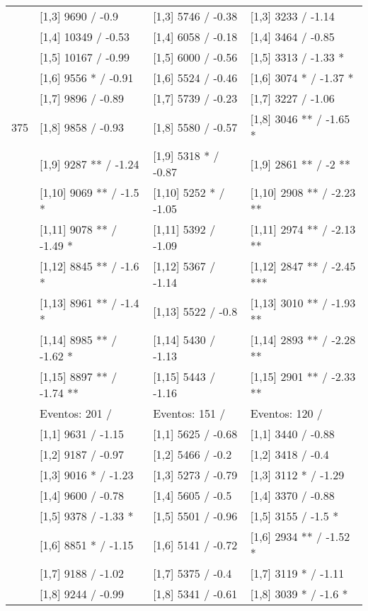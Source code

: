 \begin{table}
\begin{tabular}[t]{llll}
 & {}[1,3] 9690  / -0.9 & {}[1,3] 5746  / -0.38 & {}[1,3] 3233  / -1.14\\
\addlinespace
 & {}[1,4] 10349  / -0.53 & {}[1,4] 6058  / -0.18 & {}[1,4] 3464  / -0.85\\
 & {}[1,5] 10167  / -0.99 & {}[1,5] 6000  / -0.56 & {}[1,5] 3313  / -1.33 *\\
 & {}[1,6] 9556 * / -0.91 & {}[1,6] 5524  / -0.46 & {}[1,6] 3074 * / -1.37 *\\
 & {}[1,7] 9896  / -0.89 & {}[1,7] 5739  / -0.23 & {}[1,7] 3227  / -1.06\\
375 & {}[1,8] 9858  / -0.93 & {}[1,8] 5580  / -0.57 & {}[1,8] 3046 ** / -1.65 *\\
\addlinespace
 & {}[1,9] 9287 ** / -1.24 & {}[1,9] 5318 * / -0.87 & {}[1,9] 2861 ** / -2 **\\
 & {}[1,10] 9069 ** / -1.5 * & {}[1,10] 5252 * / -1.05 & {}[1,10] 2908 ** / -2.23 **\\
 & {}[1,11] 9078 ** / -1.49 * & {}[1,11] 5392  / -1.09 & {}[1,11] 2974 ** / -2.13 **\\
 & {}[1,12] 8845 ** / -1.6 * & {}[1,12] 5367  / -1.14 & {}[1,12] 2847 ** / -2.45 ***\\
 & {}[1,13] 8961 ** / -1.4 * & {}[1,13] 5522  / -0.8 & {}[1,13] 3010 ** / -1.93 **\\
\addlinespace
 & {}[1,14] 8985 ** / -1.62 * & {}[1,14] 5430  / -1.13 & {}[1,14] 2893 ** / -2.28 **\\
 & {}[1,15] 8897 ** / -1.74 ** & {}[1,15] 5443  / -1.16 & {}[1,15] 2901 ** / -2.33 **\\
 & Eventos:  201 / & Eventos:  151 / & Eventos:  120 /\\
 & {}[1,1] 9631  / -1.15 & {}[1,1] 5625  / -0.68 & {}[1,1] 3440  / -0.88\\
 & {}[1,2] 9187  / -0.97 & {}[1,2] 5466  / -0.2 & {}[1,2] 3418  / -0.4\\
\addlinespace
 & {}[1,3] 9016 * / -1.23 & {}[1,3] 5273  / -0.79 & {}[1,3] 3112 * / -1.29\\
 & {}[1,4] 9600  / -0.78 & {}[1,4] 5605  / -0.5 & {}[1,4] 3370  / -0.88\\
 & {}[1,5] 9378  / -1.33 * & {}[1,5] 5501  / -0.96 & {}[1,5] 3155  / -1.5 *\\
 & {}[1,6] 8851 * / -1.15 & {}[1,6] 5141  / -0.72 & {}[1,6] 2934 ** / -1.52 *\\
 & {}[1,7] 9188  / -1.02 & {}[1,7] 5375  / -0.4 & {}[1,7] 3119 * / -1.11\\
\addlinespace
500 & {}[1,8] 9244  / -0.99 & {}[1,8] 5341  / -0.61 & {}[1,8] 3039 * / -1.6 *\\

\end{tabular}
\end{table}
